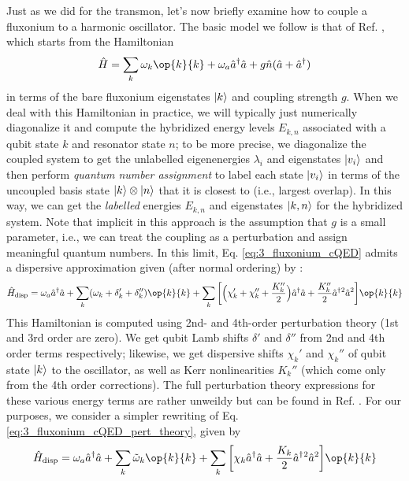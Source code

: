 Just as we did for the transmon, let's now briefly examine how to couple a fluxonium to a harmonic oscillator. The basic model we follow is that of Ref. \cite{zhu2013cQEDfluxonium}, which starts from the Hamiltonian
\begin{equation}
    \hat{H} = \sum_k \omega_k \op{k}{k} + \omega_a \hat{a}^\dagger\hat{a} + g\hat{n}(\hat{a} + \hat{a}^\dagger)
    \label{eq:3_fluxonium_cQED}
\end{equation}
in terms of the bare fluxonium eigenstates $\lvert k\rangle$ and coupling strength $g$. When we deal with this Hamiltonian in practice, we will typically just numerically diagonalize it and compute the hybridized energy levels $E_{k, n}$ associated with a qubit state $k$ and resonator state $n$; to be more precise, we diagonalize the coupled system to get the unlabelled eigenenergies $\lambda_i$ and eigenstates $\lvert v_i\rangle$ and then perform \textit{quantum number assignment} to label each state $\lvert v_i\rangle$ in terms of the uncoupled basis state $\lvert k\rangle\otimes\lvert n\rangle$ that it is closest to (i.e., largest overlap). In this way, we can get the \textit{labelled} energies $E_{k, n}$ and eigenstates $\lvert k, n\rangle$ for the hybridized system. Note that implicit in this approach is the assumption that $g$ is a small parameter, i.e., we can treat the coupling as a perturbation and assign meaningful quantum numbers. In this limit, Eq. \eqref{eq:3_fluxonium_cQED} admits a dispersive approximation given (after normal ordering) by \cite{zhu2013cQEDfluxonium}:
\begin{equation}
    \hat{H}_{\rm disp} = \omega_a \hat{a}^\dagger\hat{a} + \sum_k (\omega_k + \delta_k' + \delta_k'') \op{k}{k} + \sum_k \bigg[\Big(\chi_k' + \chi_k'' + \frac{K_k''}{2}\Big)\hat{a}^\dagger\hat{a} + \frac{K_k''}{2}\hat{a}^\dagger{}^2\hat{a}^2\bigg] \op{k}{k}
    \label{eq:3_fluxonium_cQED_pert_theory}
\end{equation}
This Hamiltonian is computed using 2nd- and 4th-order perturbation theory (1st and 3rd order are zero). We get qubit Lamb shifts $\delta'$ and $\delta''$ from 2nd and 4th order terms respectively; likewise, we get dispersive shifts $\chi_k'$ and $\chi_k''$ of qubit state $\lvert k\rangle$ to the oscillator, as well as Kerr nonlinearities $K_k''$ (which come only from the 4th order corrections). The full perturbation theory expressions for these various energy terms are rather unweildy but can be found in Ref. \cite{zhu2013cQEDfluxonium}. For our purposes, we consider a simpler rewriting of Eq. \eqref{eq:3_fluxonium_cQED_pert_theory}, given by
\begin{equation}
    \hat{H}_{\rm disp} = \omega_a \hat{a}^\dagger\hat{a} + \sum_k \tilde{\omega}_k \op{k}{k} + \sum_k \bigg[\chi_k\hat{a}^\dagger\hat{a} + \frac{K_k}{2}\hat{a}^\dagger{}^2\hat{a}^2\bigg] \op{k}{k}
\end{equation}
